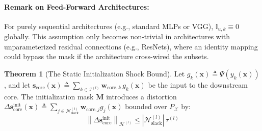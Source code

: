 \documentclass[11pt, a4paper, copyright, gdm]{google}
\newcommand{\norm}[1]{\left\lVert#1\right\rVert}
\newcommand{\sVect}{\boldsymbol{s}}
\newcommand{\wVect}{\boldsymbol{w}}
\newcommand{\xVect}{\boldsymbol{x}}
\newcommand{\calH}{\mathcal{H}}
\newcommand{\calI}{\mathcal{I}}
\newcommand{\calN}{\mathcal{N}}
\newcommand{\calX}{\mathcal{X}}
\newcommand{\Mmat}{\boldsymbol{M}}
\theoremstyle{definition}
\newtheorem{theorem}{Theorem}[section]
\begin{document}
\paragraph*{Remark on Feed-Forward Architectures:} For purely sequential architectures (e.g., standard MLPs or VGG), $\mathbb{I}_{u,k} \equiv 0$ globally. This assumption only becomes non-trivial in architectures with unparameterized residual connections (e.g., ResNets), where an identity mapping could bypass the mask if the architecture cross-wired the subsets.

\begin{theorem}[The Static Initialization Shock Bound]
\label{thm:static_bound}
Let $g_k(\xVect) \triangleq \Psi(y_k(\xVect))$, and let $\sVect_{\text{core}}(\xVect) \triangleq \sum_{k \in \calI^{(l)}} \wVect_{\text{core},k} \, g_k(\xVect)$ be the input to the downstream core. The initialization mask $\Mmat$ introduces a distortion $\Delta \sVect_{\text{core}}^{\text{init}}(\xVect) \triangleq \sum_{j \in \calN_{\text{slack}}^{(l)}} \wVect_{\text{core},j} g_j(\xVect)$ bounded over $P_\calX$ by:
\begin{equation}
    \norm{\Delta \sVect_{\text{core}}^{\text{init}}}_{\calH^{(l)}} \le |\calN_{\text{slack}}^{(l)}| \, \tau^{(l)}
\end{equation}
\end{theorem}
\end{document}
